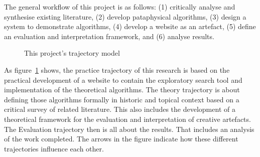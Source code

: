 The general workflow of this project is as follows: (1) critically analyse and synthesise existing literature, (2) develop pataphysical algorithms, (3) design a system to demonstrate algorithms, (4) develop a website as an artefact, (5) define an evaluation and interpretation framework, and (6) analyse results.

\begin{figure}[!htbp] %
  \centering
  \caption[This project's trajectory model]{This project's trajectory model}
\label{fig:ftmpr}
\end{figure}

As figure~\ref{fig:ftmpr} shows, the practice trajectory of this research is based on the practical development of a website to contain the exploratory search tool and implementation of the theoretical algorithms. The theory trajectory is about defining those algorithms formally in historic and topical context based on a critical survey of related literature. This also includes the development of a theoretical framework for the evaluation and interpretation of creative artefacts. The Evaluation trajectory then is all about the results. That includes an analysis of the work completed. The arrows in the figure indicate how these different trajectories influence each other.


\stopcontents[chapters]
